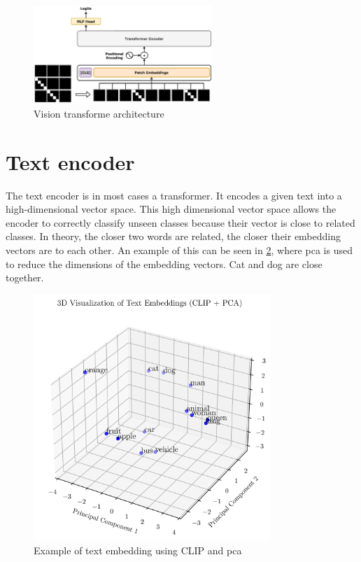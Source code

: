     \begin{figure}[]
        \centering
        \includegraphics[width=0.6\textwidth]{Images/crossmodalnetworks/Vision_Transformer.png}
        \caption{Vision transforme architecture\cite{vitwikipedia}}
        \label{fig:crossmodalnetworks:visiontransformer}
    \end{figure}


    \section{Text encoder}
    The text encoder is in most cases a transformer.
    It encodes a given text into a high-dimensional vector space.
    This high dimensional vector space allows the encoder to correctly classify unseen classes because their vector is close to related classes.
    In theory, the closer two words are related, the closer their embedding vectors are to each other.
    An example of this can be seen in \cref{fig:crossmodalnetworks:3demb}, where \Acrfull{pca} is used to reduce the dimensions of the embedding vectors.
    Cat and dog are close together.

    \begin{figure}
        \centering
        \includegraphics[width = 0.8\textwidth]{Images/crossmodalnetworks/3DEmbedding.png}
        \caption{Example of text embedding using CLIP and \Acrshort{pca}}
        \label{fig:crossmodalnetworks:3demb}
    \end{figure}
    
